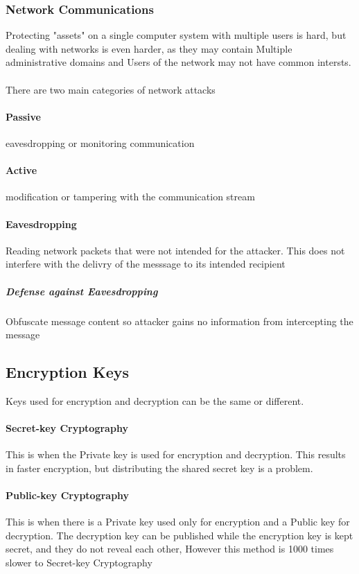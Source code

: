 \documentclass{article}
\begin{document}
\subsubsection{Network Communications}

Protecting "assets" on a single computer system with multiple users is hard, but dealing with networks is even harder, as they may contain Multiple administrative domains and Users of the network may not have common intersts.
\\
\\
There are two main categories of network attacks
\paragraph{Passive} eavesdropping or monitoring communication
\paragraph{Active} modification or tampering with the communication stream

\paragraph{Eavesdropping} Reading network packets that were not intended for the attacker. This does not interfere with the delivry of the messsage to its intended recipient

\subparagraph{Defense against Eavesdropping} Obfuscate message content so attacker gains no information from intercepting the message

\subsection{Encryption Keys}

Keys used for encryption and decryption can be the same or different.

\paragraph{Secret-key Cryptography} This is when the Private key is used for encryption and decryption. This results in faster encryption, but distributing the shared secret key is a problem.

\paragraph{Public-key Cryptography} This is when there is a Private key used only for encryption and a Public key for decryption. The decryption key can be published while the encryption key is kept secret, and they do not reveal each other, However this method is 1000 times slower to Secret-key Cryptography
\end{document}
